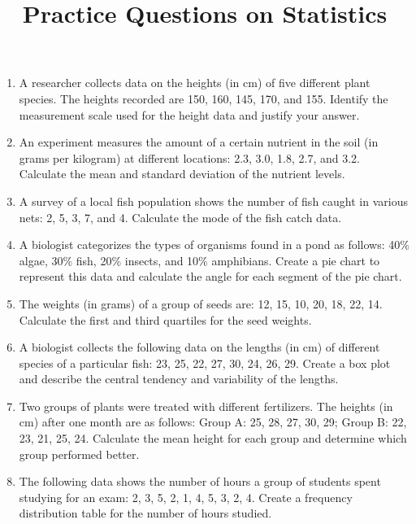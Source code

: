 \documentclass[11pt]{article}
\title{Practice Questions on Statistics}
\author{}
\begin{document}
\maketitle
\thispagestyle{fancy}

\begin{enumerate}


\item A researcher collects data on the heights (in cm) of five different plant species. The heights recorded are 150, 160, 145, 170, and 155. Identify the measurement scale used for the height data and justify your answer.

    \item An experiment measures the amount of a certain nutrient in the soil (in grams per kilogram) at different locations: 2.3, 3.0, 1.8, 2.7, and 3.2. Calculate the mean and standard deviation of the nutrient levels.

    \item A survey of a local fish population shows the number of fish caught in various nets: 2, 5, 3, 7, and 4. Calculate the mode of the fish catch data.

    \item A biologist categorizes the types of organisms found in a pond as follows: 40\% algae, 30\% fish, 20\% insects, and 10\% amphibians. Create a pie chart to represent this data and calculate the angle for each segment of the pie chart.

    \item The weights (in grams) of a group of seeds are: 12, 15, 10, 20, 18, 22, 14. Calculate the first and third quartiles for the seed weights.

    \item A biologist collects the following data on the lengths (in cm) of different species of a particular fish: 23, 25, 22, 27, 30, 24, 26, 29. Create a box plot and describe the central tendency and variability of the lengths.

    \item Two groups of plants were treated with different fertilizers. The heights (in cm) after one month are as follows: Group A: 25, 28, 27, 30, 29; Group B: 22, 23, 21, 25, 24. Calculate the mean height for each group and determine which group performed better.

    \item The following data shows the number of hours a group of students spent studying for an exam: 2, 3, 5, 2, 1, 4, 5, 3, 2, 4. Create a frequency distribution table for the number of hours studied.


\end{enumerate}
\end{document}
